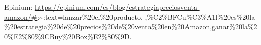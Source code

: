 \documentclass[oneside,11pt]{Latex/Classes/PhDthesisPSnPDF}
\begin{document}
Epinium:
\url{https://epinium.com/es/blog/estrategiapreciosventa-amazon/\#}:\textasciitilde:text=lanzar\%20el\%20producto.-,\%C2\%BFCu\%C3\%A1l\%20es\%20la\%20estrategia\%20de\%20precios\%20de\%20venta\%20en\%20Amazon,ganar\%20la\%20\%E2\%80\%9CBuy\%20Box\%E2\%80\%9D.\\

\renewcommand{\bibname}{Lista de Referencias}
 
 

\end{document}
